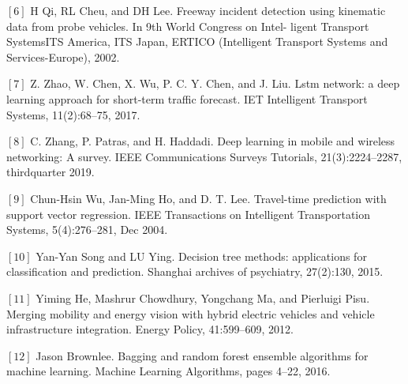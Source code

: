 \documentclass[12pt]{article}
\newcommand{\nd}{\noindent}
\begin{document}
\nd $[6]$ H Qi, RL Cheu, and DH Lee. Freeway incident detection using kinematic data from probe vehicles. In 9th World Congress on Intel- ligent Transport SystemsITS America, ITS Japan, ERTICO (Intelligent Transport Systems and Services-Europe), 2002.

\nd $[7]$ Z. Zhao, W. Chen, X. Wu, P. C. Y. Chen, and J. Liu. Lstm network: a deep learning approach for short-term traffic forecast. IET Intelligent Transport Systems, 11(2):68–75, 2017.

\nd $[8]$ C. Zhang, P. Patras, and H. Haddadi. Deep learning in mobile and wireless networking: A survey. IEEE Communications Surveys Tutorials, 21(3):2224–2287, thirdquarter 2019.

\nd $[9]$ Chun-Hsin Wu, Jan-Ming Ho, and D. T. Lee. Travel-time prediction with support vector regression. IEEE Transactions on Intelligent Transportation Systems, 5(4):276–281, Dec 2004.

\nd $[10]$ Yan-Yan Song and LU Ying. Decision tree methods: applications for classification and prediction. Shanghai archives of psychiatry, 27(2):130, 2015.

\nd $[11]$ Yiming He, Mashrur Chowdhury, Yongchang Ma, and Pierluigi Pisu. Merging mobility and energy vision with hybrid electric vehicles and vehicle infrastructure integration. Energy Policy, 41:599–609, 2012.

\nd $[12]$ Jason Brownlee. Bagging and random forest ensemble algorithms for machine learning. Machine Learning Algorithms, pages 4–22, 2016.
\end{document}
